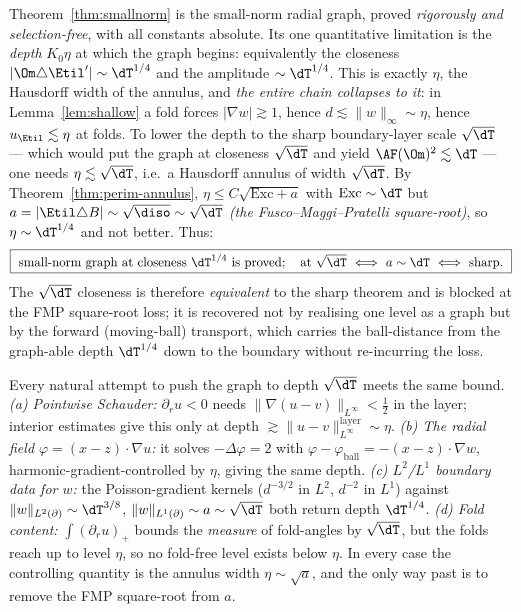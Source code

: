\begin{remark}
\label{rem:sn-wall}
Theorem~\ref{thm:smallnorm} is the small-norm radial graph, proved
\emph{rigorously and selection-free}, with all constants absolute. Its one
quantitative limitation is the \emph{depth} $K_0\eta$ at which the graph
begins: equivalently the closeness $|\Om\triangle\Etil'|\sim\dT^{1/4}$ and
the amplitude $\sim\dT^{1/4}$. This is exactly $\eta$, the Hausdorff width
of the annulus, and \emph{the entire chain collapses to it}: in
Lemma~\ref{lem:shallow} a fold forces $|\nabla w|\gtrsim1$, hence
$d\lesssim\|w\|_\infty\sim\eta$, hence $u_{\Etil}\lesssim\eta$ at folds. To
lower the depth to the sharp boundary-layer scale $\sqrt\dT$ --- which would
put the graph at closeness $\sqrt\dT$ and yield $\AF(\Om)^2\lesssim\dT$ ---
one needs $\eta\lesssim\sqrt\dT$, i.e.\ a Hausdorff annulus of width
$\sqrt\dT$. By Theorem~\ref{thm:perim-annulus},
$\eta\le C\sqrt{\mathrm{Exc}+a}$ with $\mathrm{Exc}\sim\dT$ but
$a=|\Etil\triangle B|\sim\sqrt{\diso}\sim\sqrt\dT$ \emph{(the
Fusco--Maggi--Pratelli square-root)}, so $\eta\sim\dT^{1/4}$ and not
better. Thus:
\[
   \boxed{\ \text{small-norm graph at closeness }\dT^{1/4}\ \text{is proved};\quad
   \text{at }\sqrt\dT\ \Longleftrightarrow\ a\sim\dT\ \Longleftrightarrow\ \text{sharp.}\ }
\]
The $\sqrt\dT$ closeness is therefore \emph{equivalent} to the sharp
theorem and is blocked at the FMP square-root loss; it is recovered not by
realising one level as a graph but by the forward (moving-ball) transport,
which carries the ball-distance from the graph-able depth $\dT^{1/4}$ down
to the boundary without re-incurring the loss.
\end{remark}

\begin{remark}\label{rem:sn-routes}
Every natural attempt to push the graph to depth $\sqrt\dT$ meets the same
bound. \emph{(a) Pointwise Schauder:} $\partial_r u<0$ needs
$\|\nabla(u-v)\|_{L^\infty}<\tfrac12$ in the layer; interior estimates give
this only at depth $\gtrsim\|u-v\|_{L^\infty}^{\text{layer}}\sim\eta$.
\emph{(b) The radial field $\varphi=(x-z)\cdot\nabla u$:} it solves
$-\Delta\varphi=2$ with $\varphi-\varphi_{\mathrm{ball}}=-(x-z)\cdot\nabla
w$, harmonic-gradient-controlled by $\eta$, giving the same depth.
\emph{(c) $L^2$/$L^1$ boundary data for $w$:} the Poisson-gradient kernels
($d^{-3/2}$ in $L^2$, $d^{-2}$ in $L^1$) against
$\|w\|_{L^2(\partial)}\sim\dT^{3/8}$, $\|w\|_{L^1(\partial)}\sim a\sim
\sqrt\dT$ both return depth $\dT^{1/4}$. \emph{(d) Fold content:}
$\int(\partial_r u)_+$ bounds the \emph{measure} of fold-angles by
$\sqrt\dT$, but the folds reach up to level $\eta$, so no fold-free level
exists below $\eta$. In every case the controlling quantity is the
annulus width $\eta\sim\sqrt{a}$, and the only way past is to remove the
FMP square-root from $a$.
\end{remark}
